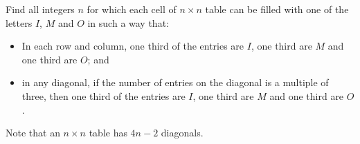 Find all integers $n$ for which each cell of $n \times n$ table
can be filled with one of the letters $I$, $M$ and $O$ in such a way that:
\begin{itemize}
\item In each row and column,  one third of the entries are $I$,
one third are $M$ and one third are $O$; and
\item in any diagonal, if the number of entries on the diagonal is a multiple of three,
then one third of the entries are $I$, one third are $M$ and one third are $O$.
\end{itemize}
Note that an $n \times n$ table has $4n-2$ diagonals.